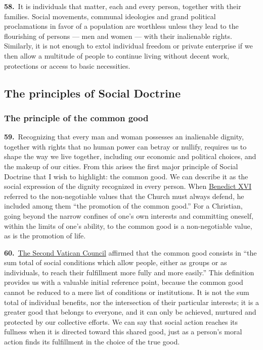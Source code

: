 \documentclass{article}
\begin{document}
\textbf{58.}\ It is individuals that matter, each and every person, together with their families. Social movements, communal ideologies and grand political proclamations in favor of a population are worthless unless they lead to the flourishing of persons --- men and women --- with their inalienable rights. Similarly, it is not enough to extol individual freedom or private enterprise if we then allow a multitude of people to continue living without decent work, protections or access to basic necessities.

\subsection{The principles of Social Doctrine}

\subsubsection{The principle of the common good}

\textbf{59.}\ Recognizing that every man and woman possesses an inalienable dignity, together with rights that no human power can betray or nullify, requires us to shape the way we live together, including our economic and political choices, and the makeup of our cities. From this arises the first major principle of Social Doctrine that I wish to highlight: the common good. We can describe it as the social expression of the dignity recognized in every person. When \href{https://www.vatican.va/content/benedict-xvi/en.html}{Benedict XVI} referred to the non-negotiable values that the Church must always defend, he included among them ``the promotion of the common good.''\cite{n75} For a Christian, going beyond the narrow confines of one's own interests and committing oneself, within the limits of one's ability, to the common good is a non-negotiable value, as is the promotion of life.

\textbf{60.}\ \href{https://www.vatican.va/archive/hist_councils/ii_vatican_council/index.htm}{The Second Vatican Council} affirmed that the common good consists in ``the sum total of social conditions which allow people, either as groups or as individuals, to reach their fulfillment more fully and more easily.''\cite{n76} This definition provides us with a valuable initial reference point, because the common good cannot be reduced to a mere list of conditions or institutions. It is not the sum total of individual benefits, nor the intersection of their particular interests; it is a greater good that belongs to everyone, and it can only be achieved, nurtured and protected by our collective efforts. We can say that social action reaches its fullness when it is directed toward this shared good, just as a person's moral action finds its fulfillment in the choice of the true good.\cite{n77}
\end{document}
